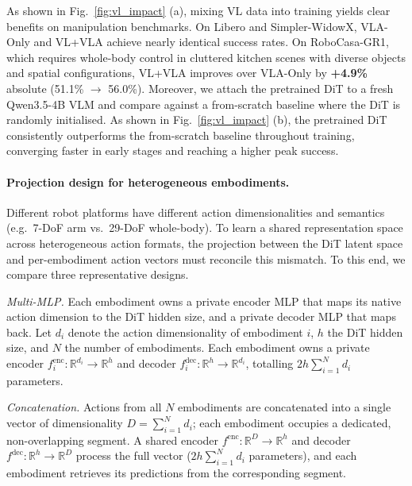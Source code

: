 \documentclass{article}
\begin{document}
  
As shown in Fig.~\ref{fig:vl_impact} (a), mixing VL data into training yields clear benefits on manipulation benchmarks.
On Libero and Simpler-WidowX, VLA-Only and VL+VLA achieve nearly identical success rates.
On RoboCasa-GR1, which requires whole-body control in cluttered kitchen scenes with diverse objects and spatial configurations, VL+VLA improves over VLA-Only by \textbf{+4.9\%} absolute (51.1\% $\to$ 56.0\%). 
%
Moreover, we attach the pretrained DiT to a fresh Qwen3.5-4B
VLM and compare against
a from-scratch baseline where the DiT is randomly initialised.
%
As shown in Fig.~\ref{fig:vl_impact} (b), the pretrained DiT
consistently outperforms the from-scratch baseline throughout training,
converging faster in early stages and reaching a higher peak success.









\paragraph{Projection design for heterogeneous embodiments.}

Different robot platforms have different action dimensionalities and
semantics (e.g.\ 7-DoF arm vs.\ 29-DoF whole-body).
To learn a shared representation space across heterogeneous action
formats, the projection between the DiT latent space and per-embodiment
action vectors must reconcile this mismatch.
To this end, we compare three representative designs.



\textit{Multi-MLP.}
Each embodiment owns a private encoder MLP that maps its native action
dimension to the DiT hidden size, and a private decoder MLP that maps
back. 
Let $d_i$ denote the action dimensionality of embodiment $i$, $h$ the
DiT hidden size, and $N$ the number of embodiments.  Each embodiment
owns a private encoder $f_i^{\mathrm{enc}}\!: \mathbb{R}^{d_i}\!\to\!\mathbb{R}^{h}$
and decoder $f_i^{\mathrm{dec}}\!: \mathbb{R}^{h}\!\to\!\mathbb{R}^{d_i}$,
totalling \textbf{$2h\!\sum_{i=1}^{N}\!d_i$}  parameters.

\textit{Concatenation.}
Actions from all $N$ embodiments are concatenated into a single vector
of dimensionality $D = \sum_{i=1}^{N} d_i$; each embodiment occupies a
dedicated, non-overlapping segment.  A shared encoder
$f^{\mathrm{enc}}\!: \mathbb{R}^{D}\!\to\!\mathbb{R}^{h}$ and decoder
$f^{\mathrm{dec}}\!: \mathbb{R}^{h}\!\to\!\mathbb{R}^{D}$ process the
full vector (\textbf{$2h\!\sum_{i=1}^{N}\!d_i$} parameters), and each embodiment retrieves its
predictions from the corresponding segment.
\end{document}
